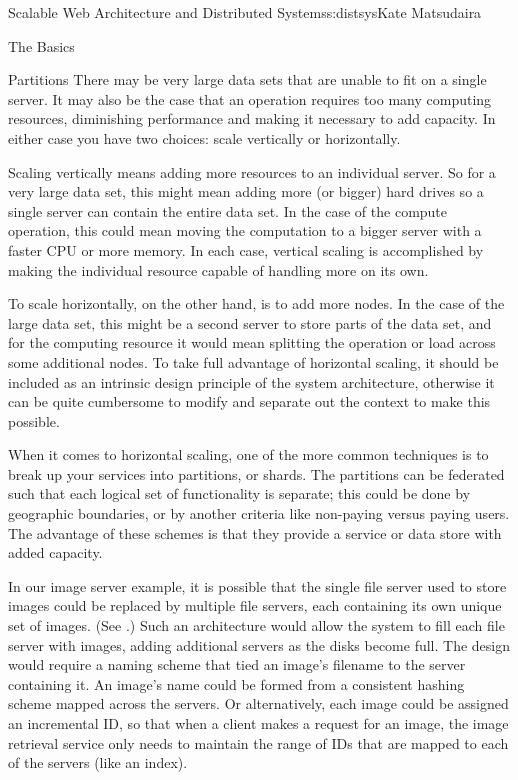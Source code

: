 \begin{aosachapter}{Scalable Web Architecture and Distributed Systems}{s:distsys}{Kate Matsudaira}
\begin{aosasect1}{The Basics}
\begin{aosasect2}{Partitions}
There may be very large data sets that are unable to fit on a single
server. It may also be the case that an operation requires too many
computing resources, diminishing performance and making it
necessary to add capacity. In either case you have two choices: scale
vertically or horizontally.

Scaling vertically means adding more resources to an individual
server. So for a very large data set, this might mean adding more (or
bigger) hard drives so a single server can contain the entire data set. In
the case of the compute operation, this could mean moving the
computation to a bigger server with a faster CPU or more memory. In
each case, vertical scaling is accomplished by making the individual
resource capable of handling more on its own.

To scale horizontally, on the other hand, is to add more nodes. In the
case of the large data set, this might be a second server to store 
parts of the data set, and for the computing resource it
would mean splitting the operation or load across some additional
nodes. To take full advantage of horizontal scaling, it should be
included as an intrinsic design principle of the system
architecture, otherwise it can be quite cumbersome to modify and
separate out the context to make this possible.

When it comes to horizontal scaling, one of the more common
techniques is to break up your services into partitions, or shards. 
The partitions can be federated such
that each logical set of functionality is separate; this could be
done by geographic boundaries, or by another criteria like non-paying versus
paying users. The advantage of these schemes is that they provide a service
or data store with added capacity.

In our image server example, it is possible that the single file
server used to store images could be replaced by multiple file
servers, each containing its own unique set of images. 
(See .) Such an
architecture would allow the system to fill each file server with
images, adding additional servers as the disks become full. The
design would require a naming scheme that tied an image's filename
to the server containing it. An image's name could be formed from a
consistent hashing scheme mapped across the servers. Or alternatively,
each image could be assigned an incremental ID, so that when a client
makes a request for an image, the image retrieval service only needs
to maintain the range of IDs that are mapped to each of the servers
(like an index).


\end{aosasect2}
\end{aosasect1}
\end{aosachapter}
